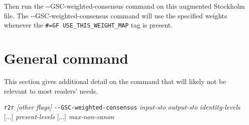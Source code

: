\documentclass[letterpaper,12pt]{report}
\begin{document}
Then run the {-{}-GSC-weighted-consensus} command on this augmented Stockholm file.
The {-{}-GSC-weighted-consensus} command will use the specified weights whenever
the {\tt \#=GF USE\_THIS\_WEIGHT\_MAP} tag is present.

\section{General command}
\label{sec:gscgeneral}

This section gives additional detail on the command that will likely not be relevant to most readers' needs.

{\tt r2r} {\it{} [other flags]} {\tt -{}-GSC-weighted-consensus} {\it input-sto} {\it output-sto} {\it identity-levels} [...] {\it present-levels} [...] {\it max-non-canon}
\end{document}
